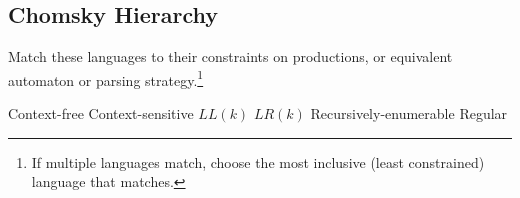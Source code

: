 \documentclass[addpoints,answers]{exam}
\begin{document}
\begin{questions}
\section{Chomsky Hierarchy}
\question Match these languages to their constraints on productions, or equivalent automaton or parsing strategy.\footnote{If multiple languages match, choose the most inclusive (least constrained) language that matches.}\\
\begin{oneparchoices}
\choice Context-free
\choice Context-sensitive
\choice $LL(k)$
\choice $LR(k)$
\choice Recursively-enumerable
\choice Regular
\end{oneparchoices}

\end{questions}
\end{document}

